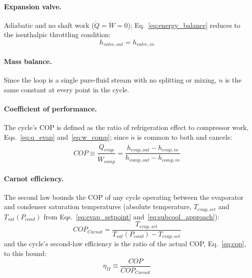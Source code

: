 \documentclass{article}
\begin{document}
\paragraph{Expansion valve.} Adiabatic and no shaft work ($\dot Q=\dot W=0$);
Eq.~\eqref{eq:energy_balance} reduces to the isenthalpic throttling condition:
\begin{equation}\label{eq:valve_isenthalpic}
    h_{valve,out} = h_{valve,in}
\end{equation}

\paragraph{Mass balance.} Since the loop is a single pure-fluid stream with
no splitting or mixing, $\dot n$ is the same constant at every point in the
cycle.

\paragraph{Coefficient of performance.} The cycle's COP is defined as the
ratio of refrigeration effect to compressor work, Eqs.~\eqref{eq:q_evap}
and~\eqref{eq:w_comp}; since $\dot n$ is common to both and cancels:
\begin{equation}\label{eq:cop}
    COP \equiv \frac{\dot Q_{evap}}{\dot W_{comp}} = \frac{h_{evap,out}-h_{evap,in}}{h_{comp,out}-h_{comp,in}}
\end{equation}

\paragraph{Carnot efficiency.} The second law bounds the COP of any cycle
operating between the evaporator and condenser saturation temperatures
(absolute temperature, $T_{evap,set}$ and $T_{sat}(P_{cond})$ from
Eqs.~\eqref{eq:evap_setpoint} and~\eqref{eq:subcool_approach}):
\begin{equation}\label{eq:cop_carnot}
    COP_{Carnot} = \frac{T_{evap,set}}{T_{sat}(P_{cond}) - T_{evap,set}}
\end{equation}
and the cycle's second-law efficiency is the ratio of the actual COP,
Eq.~\eqref{eq:cop}, to this bound:
\begin{equation}\label{eq:eta_second_law}
    \eta_{II} \equiv \frac{COP}{COP_{Carnot}}
\end{equation}
\end{document}
